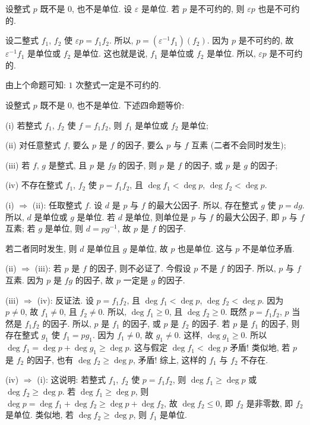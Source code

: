 \begin{proposition}
    设整式 $p$ 既不是 $0$, 也不是单位. 设 $\varepsilon$ 是单位. 若 $p$ 是不可约的, 则 $\varepsilon p$ 也是不可约的.
\end{proposition}

\begin{pf}
    设二整式 $f_1$, $f_2$ 使 $\varepsilon p = f_1 f_2$. 所以, $p = (\varepsilon^{-1} f_1) (f_2)$. 因为 $p$ 是不可约的, 故 $\varepsilon^{-1} f_1$ 是单位或 $f_2$ 是单位. 这也就是说, $f_1$ 是单位或 $f_2$ 是单位. 所以, $\varepsilon p$ 是不可约的.
\end{pf}

\begin{example}
    由上个命题可知: $1$ 次整式一定是不可约的.
\end{example}

\begin{proposition}
    设整式 $p$ 既不是 $0$, 也不是单位. 下述四命题等价:

    (i) 若整式 $f_1$, $f_2$ 使 $f = f_1 f_2$, 则 $f_1$ 是单位或 $f_2$ 是单位;

    (ii) 对任意整式 $f$, 要么 $p$ 是 $f$ 的因子, 要么 $p$ 与 $f$ 互素 (二者不会同时发生);

    (iii) 若 $f$, $g$ 是整式, 且 $p$ 是 $fg$ 的因子, 则 $p$ 是 $f$ 的因子, 或 $p$ 是 $g$ 的因子;

    (iv) 不存在整式 $f_1$, $f_2$ 使 $p = f_1 f_2$, 且 $\deg f_1 < \deg p$, $\deg f_2 < \deg p$.
\end{proposition}

\begin{pf}
    (i) $\Rightarrow$ (ii): 任取整式 $f$. 设 $d$ 是 $p$ 与 $f$ 的最大公因子. 所以, 存在整式 $g$ 使 $p = dg$. 所以, $d$ 是单位或 $g$ 是单位. 若 $d$ 是单位, 则单位是 $p$ 与 $f$ 的最大公因子, 即 $p$ 与 $f$ 互素; 若 $g$ 是单位, 则 $d = p g^{-1}$, 故 $p$ 是 $f$ 的因子.

    若二者同时发生, 则 $d$ 是单位且 $g$ 是单位, 故 $p$ 也是单位. 这与 $p$ 不是单位矛盾.

    (ii) $\Rightarrow$ (iii): 若 $p$ 是 $f$ 的因子, 则不必证了. 今假设 $p$ 不是 $f$ 的因子. 所以, $p$ 与 $f$ 互素. 因为 $p$ 是 $fg$ 的因子, 故 $p$ 一定是 $g$ 的因子.

    (iii) $\Rightarrow$ (iv): 反证法. 设 $p = f_1 f_2$, 且 $\deg f_1 < \deg p$, $\deg f_2 < \deg p$. 因为 $p \neq 0$, 故 $f_1 \neq 0$, 且 $f_2 \neq 0$. 所以, $\deg f_1 \geq 0$, 且 $\deg f_2 \geq 0$. 既然 $p = f_1 f_2$, $p$ 当然是 $f_1 f_2$ 的因子. 所以, $p$ 是 $f_1$ 的因子, 或 $p$ 是 $f_2$ 的因子. 若 $p$ 是 $f_1$ 的因子, 则存在整式 $g_1$ 使 $f_1 = pg_1$. 因为 $f_1 \neq 0$, 故 $g_1 \neq 0$. 这样, $\deg g_1 \geq 0$. 所以 $\deg f_1 = \deg p + \deg g_1 \geq \deg p$. 这与假定 $\deg f_1 < \deg p$ 矛盾! 类似地, 若 $p$ 是 $f_2$ 的因子, 也有 $\deg f_2 \geq \deg p$, 矛盾! 综上, 这样的 $f_1$ 与 $f_2$ 不存在.

    (iv) $\Rightarrow$ (i): 这说明: 若整式 $f_1$, $f_2$ 使 $p = f_1 f_2$, 则 $\deg f_1 \geq \deg p$ 或 $\deg f_2 \geq \deg p$. 若 $\deg f_1 \geq \deg p$, 则 $\deg p = \deg f_1 + \deg f_2 \geq \deg p + \deg f_2$, 故 $\deg f_2 \leq 0$, 即 $f_2$ 是非零数, 即 $f_2$ 是单位. 类似地, 若 $\deg f_2 \geq \deg p$, 则 $f_1$ 是单位.
\end{pf}

